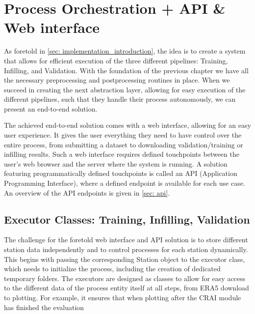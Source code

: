 \section{Process Orchestration + API \& Web interface}
\label{sec: process_orchestration}

As foretold in \autoref{sec: implementation_introduction}, the idea is to create a system that allows for efficient execution of the three different pipelines: Training, Infilling, and Validation.
With the foundation of the previous chapter we have all the necessary preprocessing and postprocessing routines in place.
When we succeed in creating the next abstraction layer, allowing for easy execution of the different pipelines, such that they handle their process autonomously, we can present an end-to-end solution.

The achieved end-to-end solution comes with a web interface, allowing for an easy user experience.
It gives the user everything they need to have control over the entire process, from submitting a dataset to downloading validation/training or infilling results.
Such a web interface requires defined touchpoints between the user's web browser and the server where the system is running.
A solution featuring programmatically defined touchpoints is called an API (Application Programming Interface), where a defined endpoint is available for each use case.
An overview of the API endpoints is given in \autoref{sec: api}. 

\subsection{Executor Classes: Training, Infilling, Validation}

The challenge for the foretold web interface and API solution is to store different station data independently and to control processes for each station dynamically.
This begins with passing the corresponding Station object to the executor class, which needs to initialize the process, including the creation of dedicated temporary folders.
The executors are designed as classes to allow for easy access to the different data of the process entity itself at all steps, from ERA5 download to plotting. For example, it ensures that when plotting after the CRAI module has finished the evaluation 

